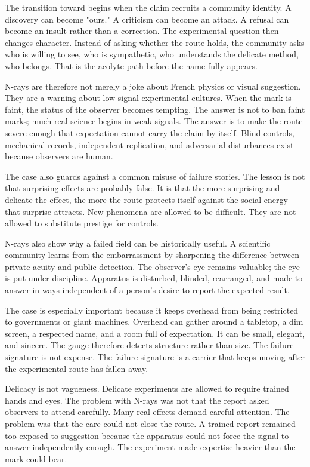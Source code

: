 The transition toward  begins when the claim recruits a
community identity. A discovery can become "ours." A criticism can become an
attack. A refusal can become an insult rather than a correction. The
experimental question then changes character. Instead of asking whether the
route holds, the community asks who is willing to see, who is sympathetic,
who understands the delicate method, who belongs. That is the acolyte path
before the name  fully appears.

N-rays are therefore not merely a joke about French physics or visual
suggestion. They are a warning about low-signal experimental cultures. When
the mark is faint, the status of the observer becomes tempting. The answer
is not to ban faint marks; much real science begins in weak signals. The
answer is to make the route severe enough that expectation cannot carry the
claim by itself. Blind controls, mechanical records, independent replication, and adversarial
disturbances exist because observers are human.

The case also guards against a common misuse of failure stories. The
lesson is not that surprising effects are probably false. It is that the
more surprising and delicate the effect, the more the route protects itself
against the social energy that surprise attracts. New phenomena are allowed
to be difficult. They are not allowed to substitute prestige for controls.

N-rays also show why a failed field can be historically useful. A scientific
community learns from the embarrassment by sharpening the difference between
private acuity and public detection. The observer's eye remains valuable; the
eye is put under discipline. Apparatus is disturbed, blinded, rearranged, and
made to answer in ways independent of a person's desire to report the
expected result.

The case is especially important because it keeps overhead from
being restricted to governments or giant machines. Overhead can gather around
a tabletop, a dim screen, a respected name, and a room full of expectation.
It can be small, elegant, and sincere. The gauge therefore detects structure
rather than size. The failure signature is not expense. The failure
signature is a carrier that keeps moving after the experimental route has
fallen away.

Delicacy is not vagueness. Delicate experiments are allowed to require
trained hands and eyes. The problem with N-rays was not that the report
asked observers to attend carefully. Many real effects demand careful
attention. The problem was that the care could not close the route. A
trained report remained too exposed to suggestion because the apparatus
could not force the signal to answer independently enough. The experiment made
expertise heavier than the mark could bear.

